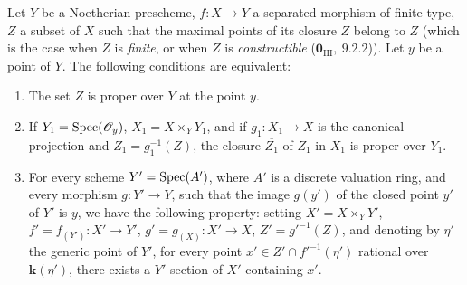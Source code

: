 \begin{corollary}[15.7.4]
\label{IV.15.7.4}
Let $Y$ be a Noetherian prescheme, $f:X\to Y$ a separated morphism of finite type, $Z$ a subset of $X$ such that the maximal points of its closure $\overline{Z}$ belong to $Z$ \textup{(which is the case when $Z$ is \emph{finite}, or when $Z$ is \emph{constructible} ($\mathbf{0}_{\mathrm{III}},~9.2.2$))}.
Let $y$ be a point of $Y$.
The following conditions are equivalent:
\begin{enumerate}[label=\emph{\alph*)}]
  \item The set $\overline{Z}$ is proper over $Y$ at the point $y$.
  \item If $Y_1=\operatorname{Spec}(\mathscr{O}_y)$, $X_1=X\times_Y Y_1$, and if $g_1:X_1\to X$ is the canonical projection and $Z_1=g_1^{-1}(Z)$, the closure $\overline{Z_1}$ of $Z_1$ in $X_1$ is proper over $Y_1$.
  \item For every scheme $Y'=\operatorname{Spec}(A')$, where $A'$ is a discrete valuation ring, and every morphism $g:Y'\to Y$, such that the image $g(y')$ of the closed point $y'$ of $Y'$ is $y$, we have the following property: setting $X'=X\times_Y Y'$, $f'=f_{(Y')}:X'\to Y'$, $g'=g_{(X)}:X'\to X$, $Z'=g'^{-1}(Z)$, and denoting by $\eta'$
the generic point of $Y'$, for every point $x'\in Z'\cap f'^{-1}(\eta')$ rational over $\boldsymbol{k}(\eta')$, there exists a $Y'$-section of $X'$ containing $x'$.
\end{enumerate}
\end{corollary}

